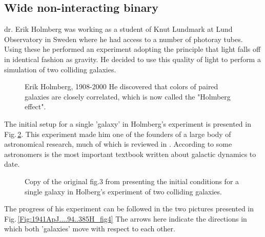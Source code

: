 
\subsection{Wide non-interacting binary}\label{Sect:Ass.GD_SE.Widebinary}

dr. Erik Holmberg was working as a student of Knut Lundmark at Lund
Observatory in Sweden where he had access to a number of photoray
tubes. Using these he performed an experiment adopting the principle
that light falls off in identical fashion as gravity. He decided to use
this quality of light to perform a simulation of two colliding
galaxies.

\begin{figure}[htbp] 
  \begin{center}
      \caption{Erik Holmberg, 1908-2000\newline 
          He discovered that
          colors of paired galaxies are closely correlated, which is
          now called the "Holmberg effect".  
      \label{Fig:1941ApJ....94..385H_fig3}
      }
  \end{center}
\end{figure}

The initial setup for a single 'galaxy' in Holmberg's experiment is
presented in Fig.\,\ref{Fig:1941ApJ....94..385H_fig3}.  This
experiment made him one of the founders of a large body of
astronomical research, much of which is reviewed in
\cite{1987gady.book.....B}. According to some astronomers
\cite{1987gady.book.....B} is the most important textbook written
about galactic dynamics to date.

\begin{figure}[htbp] 
  \begin{center}
      \caption{{\small Copy of the original fig.3 from
          \cite{1941ApJ....94..385H} presenting the initial conditions
          for a single galaxy in Holberg's experiment of two colliding
          galaxies. }
      \label{Fig:1941ApJ....94..385H_fig3}
      }
  \end{center}
\end{figure}

The progress of his experiment can be followed in the two pictures
presented in Fig.\,\ref{Fig:1941ApJ....94..385H_fig4} The arrows here
indicate the directions in which both 'galaxies' move with respect to
each other.

